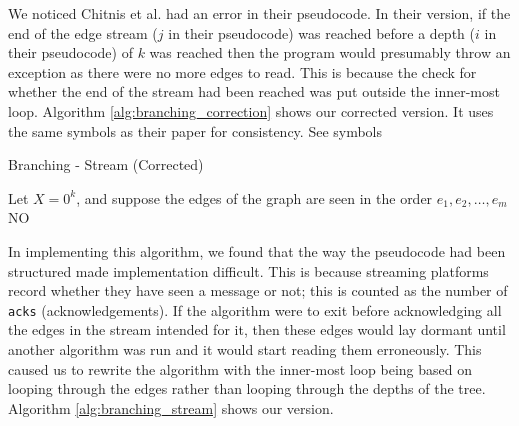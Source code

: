 We noticed Chitnis et al. had an error in their pseudocode. In their version,
if the end of the edge stream (\(j\) in their pseudocode) was reached before a
depth (\(i\) in their pseudocode) of \(k\) was reached then the program would
presumably throw an exception as there were no more edges to read. This is
because the check for whether the end of the stream had been reached was put
outside the inner-most loop. Algorithm \ref{alg:branching_correction} shows our
corrected version. It uses the same symbols as their paper for consistency. See
symbols

\begin{algorithm}[htb]
    \caption{Branching - Stream (Corrected)}
    \label{alg:branching_correction}
    \DontPrintSemicolon


    Let $X = 0^k$, and suppose the edges of the graph are seen in the order $e_1, e_2, \dots, e_m$\;
    \Return NO
\end{algorithm}

In implementing this algorithm, we found that the way the pseudocode had been
structured made implementation difficult. This is because streaming platforms
record whether they have seen a message or not; this is counted as the number
of \texttt{acks} (acknowledgements). If the algorithm were to exit before
acknowledging all the edges in the stream intended for it, then these edges
would lay dormant until another algorithm was run and it would start reading
them erroneously. This caused us to rewrite the algorithm with the inner-most
loop being based on looping through the edges rather than looping through the
depths of the tree. Algorithm \ref{alg:branching_stream} shows our version.

